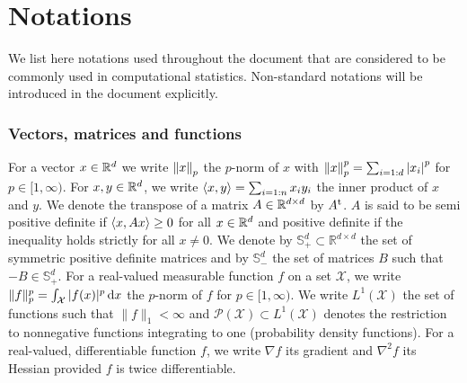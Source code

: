 
\chapter*{Notations}

We list here notations used throughout the document that are considered to be commonly used in computational statistics. Non-standard notations will be introduced in the document explicitly.

\subsection*{Vectors, matrices and functions} 
For a vector $x\in\mathbb R^{d}$ we write $\left\|x\right\|_{p}$ the $p$-norm of $x$ with $\left\|x\right\|_{p}^{p}=\sum_{i=1:d}\left|x_{i}\right|^{p}$ for $p\in[1,\infty)$. 
For $x,y\in\mathbb R^{d}$, we write $\left\langle x,y \right\rangle=\sum_{i=1:n}x_{i}y_{i}$ the inner product of $x$ and $y$. 
We denote the transpose of a matrix $A\in\mathbb R^{d\times d}$ by $A^\mathrm{t}$. $A$ is said to be semi positive definite if $\left\langle x,Ax \right\rangle\ge 0$ for all $x\in\mathbb R^{d}$ and positive definite if the inequality holds strictly for all $x\neq 0$. We denote by $\mathbb S_+^{d}\subset \mathbb R^{d\times d}$ the set of symmetric positive definite matrices and by $\mathbb S_-^{d}$ the set of matrices $B$ such that $-B\in\mathbb S_+^{d}$.
For a real-valued measurable function $f$ on a set $\mathcal X$, we write $\|f\|_{p}^{p}=\int_{\mathcal X} |f(x)|^{p}\,\mathrm{d} x$ the $p$-norm of $f$ for $p\in[1,\infty)$. 
We write $L^{1}(\mathcal X)$ the set of functions such that $\|f\|_{1}<\infty$ and $\mathcal P(\mathcal X) \subset L^{1}(\mathcal X)$ denotes the restriction to nonnegative functions integrating to one (probability density functions). 
For a real-valued, differentiable function $f$, we write $\nabla f$ its gradient and $\nabla^{2} f$ its Hessian provided $f$ is twice differentiable.
%
